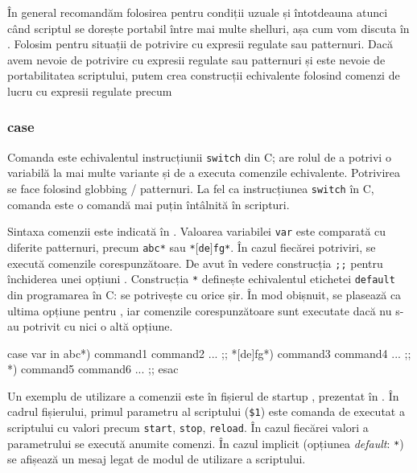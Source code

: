 În general recomandăm folosirea  pentru condiții uzuale și întotdeauna atunci când scriptul se dorește portabil între mai multe shelluri, așa cum vom discuta în .
Folosim \cmd{$[[$} pentru situații de potrivire cu expresii regulate sau patternuri.
Dacă avem nevoie de potrivire cu expresii regulate sau patternuri și este nevoie de portabilitatea scriptului, putem crea construcții echivalente folosind comenzi de lucru cu expresii regulate precum 

\subsubsection{case}
\label{sec:auto:script-func:flow-control:case}

Comanda  este echivalentul instrucțiunii \texttt{switch} din C; are rolul de a
potrivi o variabilă la mai multe variante și de a executa comenzile echivalente.
Potrivirea se face folosind globbing / patternuri.
La fel ca instrucțiunea \texttt{switch} în C, comanda  este o comandă mai puțin întâlnită în scripturi.

Sintaxa comenzii  este indicată în .
Valoarea variabilei \texttt{var} este comparată cu diferite patternuri, precum \texttt{abc*} sau \texttt{*$[$de$]$fg*}.
În cazul fiecărei potriviri, se execută comenzile corespunzătoare.
De avut în vedere construcția \texttt{;;} pentru închiderea unei opțiuni .
Construcția \texttt{*} definește echivalentul etichetei \texttt{default} din programarea în C: se potrivește cu orice șir.
În mod obișnuit, se plasează ca ultima opțiune pentru , iar comenzile corespunzătoare sunt executate dacă nu s-au potrivit cu nici o altă opțiune.

\begin{screen}[caption={Sintaxa comenzii case},label={lst:auto:case-syntax}]
case var in
    abc*)
        command1
        command2
        ...
        ;;
    *[de]fg*)
        command3
        command4
        ...
        ;;
    *)
        command5
        command6
        ...
        ;;
esac
\end{screen}

Un exemplu de utilizare a comenzii  este în fișierul de startup , prezentat în .
În cadrul fișierului, primul parametru al scriptului (\texttt{\$1}) este comanda de executat a scriptului cu valori precum \texttt{start}, \texttt{stop}, \texttt{reload}.
În cazul fiecărei valori a parametrului se execută anumite comenzi.
În cazul implicit (opțiunea \textit{default}: \texttt{*}) se afișează un mesaj legat de modul de utilizare a scriptului.

